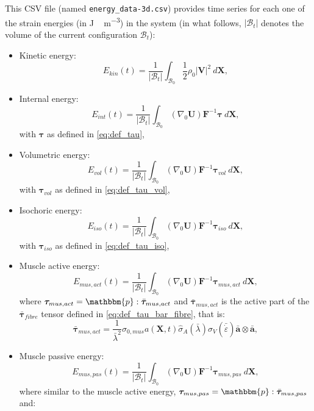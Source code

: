 \documentclass{sfuthesis}
\numberwithin{equation}{section}
\numberwithin{figure}{chapter}
\numberwithin{table}{chapter}
\theoremstyle{definition}
\def\*#1{{\mathbf{#1}}} %
\newcommand{\depsilon}{\dot{\varepsilon}}
\newcommand{\B}{\mathcal{B}}
\newcommand{\p}{\mathbbm{p}}
\def\btau{{\bm{\tau}}}
\begin{document}
This CSV file (named \texttt{energy\_data-3d.csv}) provides time series for each one of the strain energies (in \unit{J \, m^{-3}}) in the system (in what follows, $|\B_t|$ denotes the volume of the current configuration $\B_t$):
\begin{itemize}
    \item Kinetic energy:
    \begin{equation}
        E_{kin}(t) = \dfrac{1}{|\B_t|} \int_{\B_0} \dfrac{1}{2} \rho_0 |\*V|^2 \ d\*X,
    \end{equation}
    \item Internal energy:
    \begin{equation}
        E_{int}(t) = \dfrac{1}{|\B_t|} \int_{\B_0} (\nabla_0 \*U) \*F^{-1} \btau \ d\*X,
    \end{equation}
    with $\btau$ as defined in \eqref{eq:def_tau},
    \item Volumetric energy:
    \begin{equation}
        E_{vol}(t) = \dfrac{1}{|\B_t|} \int_{\B_0} (\nabla_0 \*U) \*F^{-1} \btau_{vol} \ d\*X,
    \end{equation}
    with $\btau_{vol}$ as defined in \eqref{eq:def_tau_vol},
    \item Isochoric energy:
    \begin{equation}
        E_{iso}(t) = \dfrac{1}{|\B_t|} \int_{\B_0} (\nabla_0 \*U) \*F^{-1} \btau_{iso} \ d\*X,
    \end{equation}
    with $\btau_{iso}$ as defined in \eqref{eq:def_tau_iso},
    \item Muscle active energy:
    \begin{equation}
        E_{mus,act}(t) = \dfrac{1}{|\B_t|} \int_{\B_0} (\nabla_0 \*U) \*F^{-1} \btau_{mus,act} \ d\*X,
    \end{equation}
    where $\btau_{mus,act} = \p : \bar{\btau}_{mus,act}$ and $\bar{\btau}_{mus,act}$ is the active part of the $\bar{\btau}_{fibre}$ tensor defined in \eqref{eq:def_tau_bar_fibre}, that is:
    \[
        \bar{\btau}_{mus,act} = \dfrac{1}{\bar{\lambda}^2} \sigma_{0,mus}  a(\*X,t) \widehat{\sigma}_A(\bar{\lambda}) \widehat{\sigma}_V(\bar{\depsilon})  \bar{\*a} \otimes \bar{\*a},
    \]
    \item Muscle passive energy:
    \begin{equation}
        E_{mus,pas}(t) = \dfrac{1}{|\B_t|} \int_{\B_0} (\nabla_0 \*U) \*F^{-1} \btau_{mus,pas} \ d\*X,
    \end{equation}
    where similar to the muscle active energy,  $\btau_{mus,pas} = \p : \bar{\btau}_{mus,pas}$ and:

\end{itemize}
\end{document}
